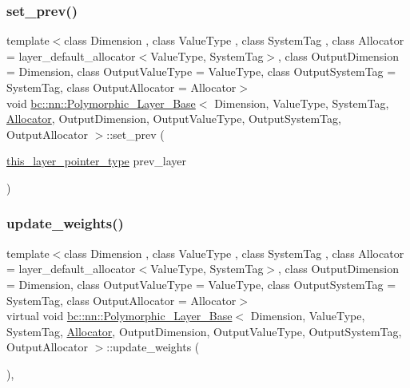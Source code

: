 \subsubsection{\texorpdfstring{set\+\_\+prev()}{set\_prev()}\hspace{0.1cm}{\footnotesize\ttfamily [2/2]}}
{\footnotesize\ttfamily template$<$class Dimension , class Value\+Type , class System\+Tag , class Allocator  = layer\+\_\+default\+\_\+allocator$<$\+Value\+Type, System\+Tag$>$, class Output\+Dimension  = Dimension, class Output\+Value\+Type  = Value\+Type, class Output\+System\+Tag  = System\+Tag, class Output\+Allocator  = Allocator$>$ \\
void \hyperlink{structbc_1_1nn_1_1Polymorphic__Layer__Base}{bc\+::nn\+::\+Polymorphic\+\_\+\+Layer\+\_\+\+Base}$<$ Dimension, Value\+Type, System\+Tag, \hyperlink{classbc_1_1allocators_1_1Allocator}{Allocator}, Output\+Dimension, Output\+Value\+Type, Output\+System\+Tag, Output\+Allocator $>$\+::set\+\_\+prev (\begin{DoxyParamCaption}\item[{\hyperlink{structbc_1_1nn_1_1Polymorphic__Layer__Base_a6240b9012fcc8ed91d8a41f07d7c4bd9}{this\+\_\+layer\+\_\+pointer\+\_\+type}}]{prev\+\_\+layer }\end{DoxyParamCaption})\hspace{0.3cm}{\ttfamily [inline]}}

\mbox{\label{structbc_1_1nn_1_1Polymorphic__Layer__Base_ac4e83d85cab03ae8ac5d918fe4e08df6}} 
\subsubsection{\texorpdfstring{update\+\_\+weights()}{update\_weights()}\hspace{0.1cm}{\footnotesize\ttfamily [1/2]}}
{\footnotesize\ttfamily template$<$class Dimension , class Value\+Type , class System\+Tag , class Allocator  = layer\+\_\+default\+\_\+allocator$<$\+Value\+Type, System\+Tag$>$, class Output\+Dimension  = Dimension, class Output\+Value\+Type  = Value\+Type, class Output\+System\+Tag  = System\+Tag, class Output\+Allocator  = Allocator$>$ \\
virtual void \hyperlink{structbc_1_1nn_1_1Polymorphic__Layer__Base}{bc\+::nn\+::\+Polymorphic\+\_\+\+Layer\+\_\+\+Base}$<$ Dimension, Value\+Type, System\+Tag, \hyperlink{classbc_1_1allocators_1_1Allocator}{Allocator}, Output\+Dimension, Output\+Value\+Type, Output\+System\+Tag, Output\+Allocator $>$\+::update\+\_\+weights (\begin{DoxyParamCaption}{ }\end{DoxyParamCaption})\hspace{0.3cm}{\ttfamily [inline]}, {\ttfamily [virtual]}}

